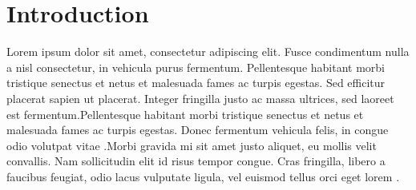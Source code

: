 \documentclass{article}
\begin{document}
\section{Introduction}
Lorem ipsum dolor sit amet, consectetur adipiscing elit. Fusce condimentum nulla a nisl
consectetur, in vehicula purus fermentum. Pellentesque habitant morbi tristique senectus et
netus et malesuada fames ac turpis egestas. Sed efficitur placerat sapien ut placerat. Integer
fringilla justo ac massa ultrices, sed laoreet est fermentum.Pellentesque habitant morbi
tristique senectus et netus et malesuada fames ac turpis egestas. Donec fermentum vehicula
felis, in congue odio volutpat vitae \cite{citation1,
citation2, citation3, citation4, citation5, citation6, citation7, citation8,
citation9,citation10}.Morbi gravida mi sit amet justo aliquet, eu mollis velit convallis. Nam
sollicitudin elit id risus tempor congue. Cras fringilla, libero a faucibus feugiat, odio lacus
vulputate ligula,
vel euismod tellus orci eget lorem \cite{citation11, citation12,citation13, citation14,citation15,
citation16, citation17, citation18, citation19, citation20}.
\end{document}
